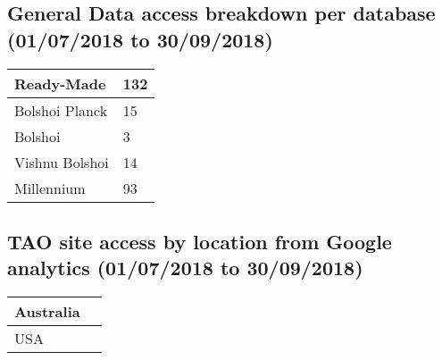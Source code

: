 \documentclass{article}%
\begin{document}
\subsection{General Data access breakdown per database (01/07/2018 to 30/09/2018)}%

%
\begin{longtabu}{X[l] X[l]}%
Ready{-}Made&132\\%
\hline%
Bolshoi Planck&15\\%
\hline%
Bolshoi&3\\%
\hline%
Vishnu Bolshoi&14\\%
\hline%
Millennium&93\\%
\hline%
\end{longtabu}%
\subsection{TAO site access by location from Google analytics (01/07/2018 to 30/09/2018)}%

%
\begin{longtabu}{X[l] X[l]}%
Australia&\\%
\hline%
USA&\\%
\hline%
\end{longtabu}%
\end{document}
